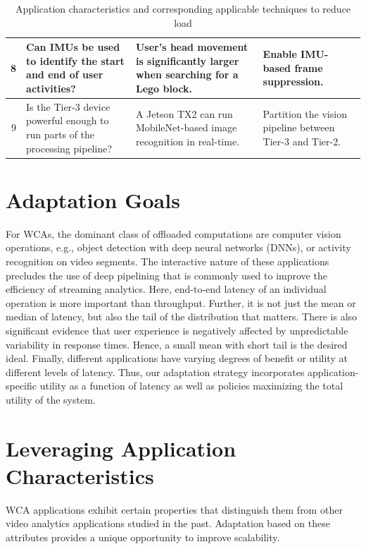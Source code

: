 \begin{table}[]
\begin{tabular}{|r|p{25ex}|p{30ex}|p{25ex}|}
    8&Can IMUs be used to identify the start and end of user activities?
        & User's head movement is significantly larger when searching for a Lego block.
        & Enable IMU-based frame suppression. \\ \hline
    9&Is the Tier-3 device powerful enough to run parts of the processing pipeline?
        & A Jetson TX2 can run MobileNet-based image recognition in real-time.
        & Partition the vision pipeline between Tier-3 and Tier-2.   \\ \hline
    \end{tabular}
\vspace{0.1in}
    \caption{Application characteristics and corresponding applicable techniques to reduce load}
    \label{tab:questions-techniques}
\end{table}

\section{Adaptation Goals}
 
For WCAs, the dominant class of offloaded computations are computer vision
operations, e.g., object detection with deep neural networks (DNNs), or activity
recognition on video segments. The interactive nature of these applications
precludes the use of deep pipelining that is commonly used to improve the
efficiency of streaming analytics.  Here, end-to-end latency of an individual
operation is more important than throughput. Further, it is not just the mean or
median of latency, but also the tail of the distribution that matters.  There is
also significant evidence that user experience is negatively affected by
unpredictable variability in response times. Hence, a small mean with short tail
is the desired ideal. Finally, different applications have varying degrees of
benefit or utility at different levels of latency.  Thus, our adaptation
strategy incorporates application-specific utility as a function of latency as
well as policies maximizing the total utility of the system.


\section{Leveraging Application Characteristics}
\label{sec:workload-reduction}

WCA applications exhibit certain properties that distinguish them from
other video analytics applications studied in the past.  Adaptation
based on these attributes provides a unique opportunity to improve
scalability.

